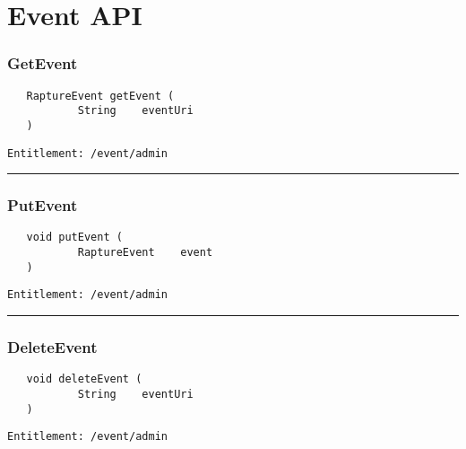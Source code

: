 \chapter{Event API}

\subsection{GetEvent}
\label{Api:GetEvent}
\begin{verbatim}
   RaptureEvent getEvent (
           String    eventUri
   )
\end{verbatim}
\begin{Verbatim}[fontsize=\small, formatcom=\color{Maroon}]
  Entitlement: /event/admin
\end{Verbatim}



\rule{12cm}{2pt}
\subsection{PutEvent}
\label{Api:PutEvent}
\begin{verbatim}
   void putEvent (
           RaptureEvent    event
   )
\end{verbatim}
\begin{Verbatim}[fontsize=\small, formatcom=\color{Maroon}]
  Entitlement: /event/admin
\end{Verbatim}



\rule{12cm}{2pt}
\subsection{DeleteEvent}
\label{Api:DeleteEvent}
\begin{verbatim}
   void deleteEvent (
           String    eventUri
   )
\end{verbatim}
\begin{Verbatim}[fontsize=\small, formatcom=\color{Maroon}]
  Entitlement: /event/admin
\end{Verbatim}



